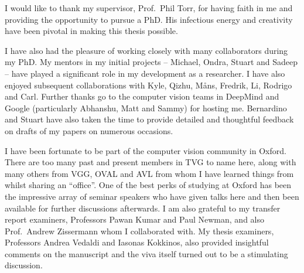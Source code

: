 \begin{acknowledgements}

I would like to thank my supervisor, Prof.~Phil Torr, for having faith in me and providing the opportunity to pursue a PhD.
His infectious energy and creativity have been pivotal in making this thesis possible.

I have also had the pleasure of working closely with many collaborators during my PhD. 
My mentors in my initial projects -- Michael, Ondra, Stuart and Sadeep -- have played a significant role in my development as a researcher.
I have also enjoyed subsequent collaborations with Kyle, Qizhu, M{\aa}ns, Fredrik, Li, Rodrigo and Carl.
Further thanks go to the computer vision teams in DeepMind and Google (particularly Abhanshu, Matt and Sammy) for hosting me. %
Bernardino and Stuart have also taken the time to provide detailed and thoughtful feedback on drafts of my papers on numerous occasions.

I have been fortunate to be part of the computer vision community in Oxford.
There are too many past and present members in TVG to name here, along with many others from VGG, OVAL and AVL from whom I have learned things from whilst sharing an ``office''.
One of the best perks of studying at Oxford has been the impressive array of seminar speakers who have given talks here and then been available for further discussions afterwards.
I am also grateful to my transfer report examiners, Professors Pawan Kumar and Paul Newman, and also Prof.~Andrew Zissermann whom I collaborated with.
My thesis examiners, Professors Andrea Vedaldi and Iasonas Kokkinos, also provided insightful comments on the manuscript and the viva itself turned out to be a stimulating discussion.

\iffalse
Furthermore, it has been a priviledge to regularly have 

 have a steady stream of invited seminar speakers, and 

, -- there are too many past and present members in TVG to name here, along with many other

-- multiple reserach groups
-- top speakers
	-- In both cases, I have learned cool stuff from them.
	-- had good audience questions
-- transfer report, AZ
	
I have been fortunate to be part of the computer vision community in Oxford, with its impressive array of invited seminar speakers, and filled with many great minds from whom I have learned a lot from.
There are too many past and present members in TVG to name here, along with many others from VGG, OVAL and AVL.
I am also grateful to my transfer report examiners, Professors Pawan Kumar and Paul Newman, and also Prof. Andrew Zisserman whom I collaborated with and learned a lot from.
\fi


\end{acknowledgements}
